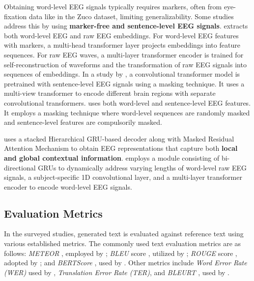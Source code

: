 Obtaining word-level EEG signals typically requires markers, often from eye-fixation data like in the Zuco dataset, limiting generalizability. Some studies address this by using \textbf{marker-free and sentence-level EEG signals}. \citet{duan2023dewave} extracts both word-level EEG and raw EEG embeddings. For word-level EEG features with markers, a multi-head transformer layer projects embeddings into feature sequences. For raw EEG waves, a multi-layer transformer encoder is trained for self-reconstruction of waveforms and the transformation of raw EEG signals into sequences of embeddings. In a study by \citet{liu2024eeg2text}, a convolutional transformer model is pretrained with sentence-level EEG signals using a masking technique. It uses a multi-view transformer to encode different brain regions with separate convolutional transformers. \citet{wang2024enhancing} uses both word-level and sentence-level EEG features. It employs a masking technique where word-level sequences are randomly masked and sentence-level features are compulsorily masked.

\citet{chen2025decoding} uses a stacked Hierarchical GRU-based decoder along with Masked Residual Attention Mechanism to obtain EEG representations that capture both \textbf{local and global contextual information}. \citet{amrani2024deep} employs a module consisting of bi-directional GRUs to dynamically address varying lengths of word-level raw EEG signals, a subject-specific 1D convolutional layer, and a multi-layer transformer encoder to encode word-level EEG signals.

\subsection{Evaluation Metrics}
In the surveyed studies, generated text is evaluated against reference text using various established metrics. The commonly used text evaluation metrics are as follows: \textit{METEOR} \cite{banerjee2005meteor}, employed by \cite{biswal2019eegtotext, chen2025decoding}; \textit{BLEU} score \cite{papineni2002bleu}, utilized by \cite{biswal2019eegtotext, wang2022open, feng2023aligning}; \textit{ROUGE} score \cite{lin2004rouge}, adopted by \cite{wang2022open, feng2023aligning, duan2023dewave, liu2024eeg2text, wang2024enhancing}; and \textit{BERTScore} \cite{zhang2019bertscore}, used by \cite{amrani2024deep, mishra2024thought2text}. Other metrics include \textit{Word Error Rate (WER)} used by \cite{feng2023aligning}, \textit{Translation Error Rate (TER)}, and \textit{BLEURT} \cite{sellam2020bleurt}, used by \cite{chen2025decoding}.


